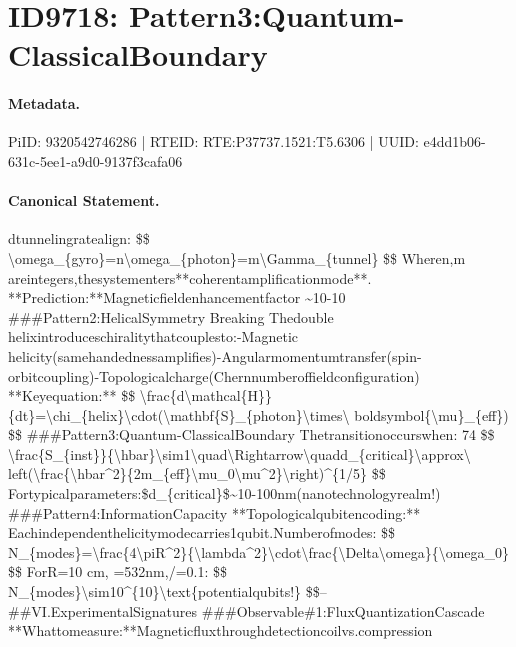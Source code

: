 \section*{ID9718: Pattern3:Quantum-ClassicalBoundary}
\paragraph{Metadata.}
PiID: 9320542746286 | RTEID: RTE:P37737.1521:T5.6306 | UUID: e4dd1b06-631c-5ee1-a9d0-9137f3cafa06

\paragraph{Canonical Statement.}
dtunnelingratealign: \$\$ \textbackslash{}omega\_\{gyro\}=n\textbackslash{}omega\_\{photon\}=m\textbackslash{}Gamma\_\{tunnel\} \$\$ Wheren,m areintegers,thesystementers**coherentamplificationmode**. **Prediction:**Magneticfieldenhancementfactor \textasciitilde{}10-10 \#\#\#Pattern2:HelicalSymmetry Breaking Thedouble helixintroduceschiralitythatcouplesto:-Magnetic helicity(samehandednessamplifies)-Angularmomentumtransfer(spin-orbitcoupling)-Topologicalcharge(Chernnumberoffieldconfiguration) **Keyequation:** \$\$ \textbackslash{}frac\{d\textbackslash{}mathcal\{H\}\}\{dt\}=\textbackslash{}chi\_\{helix\}\textbackslash{}cdot(\textbackslash{}mathbf\{S\}\_\{photon\}\textbackslash{}times\textbackslash{} boldsymbol\{\textbackslash{}mu\}\_\{eff\}) \$\$ \#\#\#Pattern3:Quantum-ClassicalBoundary Thetransitionoccurswhen: 74 \$\$ \textbackslash{}frac\{S\_\{inst\}\}\{\textbackslash{}hbar\}\textbackslash{}sim1\textbackslash{}quad\textbackslash{}Rightarrow\textbackslash{}quadd\_\{critical\}\textbackslash{}approx\textbackslash{} left(\textbackslash{}frac\{\textbackslash{}hbar\textasciicircum{}2\}\{2m\_\{eff\}\textbackslash{}mu\_0\textbackslash{}mu\textasciicircum{}2\}\textbackslash{}right)\textasciicircum{}\{1/5\} \$\$ Fortypicalparameters:\$d\_\{critical\}\$\textasciitilde{}10-100nm(nanotechnologyrealm!) \#\#\#Pattern4:InformationCapacity **Topologicalqubitencoding:** Eachindependenthelicitymodecarries1qubit.Numberofmodes: \$\$ N\_\{modes\}=\textbackslash{}frac\{4\textbackslash{}piR\textasciicircum{}2\}\{\textbackslash{}lambda\textasciicircum{}2\}\textbackslash{}cdot\textbackslash{}frac\{\textbackslash{}Delta\textbackslash{}omega\}\{\textbackslash{}omega\_0\} \$\$ ForR=10 cm, =532nm,/=0.1: \$\$ N\_\{modes\}\textbackslash{}sim10\textasciicircum{}\{10\}\textbackslash{}text\{potentialqubits!\} \$\$-- \#\#VI.ExperimentalSignatures \#\#\#Observable\#1:FluxQuantizationCascade **Whattomeasure:**Magneticfluxthroughdetectioncoilvs.compression

